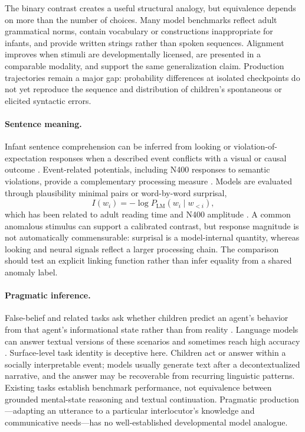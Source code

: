 The binary contrast creates a useful structural analogy, but equivalence depends on more than the number of choices. Many model benchmarks reflect adult grammatical norms, contain vocabulary or constructions inappropriate for infants, and provide written strings rather than spoken sequences. Alignment improves when stimuli are developmentally licensed, are presented in a comparable modality, and support the same generalization claim. Production trajectories remain a major gap: probability differences at isolated checkpoints do not yet reproduce the sequence and distribution of children's spontaneous or elicited syntactic errors.

\paragraph{Sentence meaning.}
Infant sentence comprehension can be inferred from looking or violation-of-expectation responses when a described event conflicts with a visual or causal outcome \citep{aslin2007s,Margoni2023}. Event-related potentials, including N400 responses to semantic violations, provide a complementary processing measure \citep{friedrich2006early,lozano2025development}. Models are evaluated through plausibility minimal pairs or word-by-word surprisal,
\[
  I(w_i) = -\log P_{\mathrm{LM}}(w_i \mid w_{<i}),
\]
which has been related to adult reading time and N400 amplitude \citep{hale2001probabilistic,SmithLevy2013,frank2015erp,michaelov2024strong}. A common anomalous stimulus can support a calibrated contrast, but response magnitude is not automatically commensurable: surprisal is a model-internal quantity, whereas looking and neural signals reflect a larger processing chain. The comparison should test an explicit linking function rather than infer equality from a shared anomaly label.

\paragraph{Pragmatic inference.}
False-belief and related tasks ask whether children predict an agent's behavior from that agent's informational state rather than from reality \citep{WimmerPerner1983,Wellman2001,Astington2007}. Language models can answer textual versions of these scenarios and sometimes reach high accuracy \citep{Kosinski2023,Kosinski2023b,Strachan2024}. Surface-level task identity is deceptive here. Children act or answer within a socially interpretable event; models usually generate text after a decontextualized narrative, and the answer may be recoverable from recurring linguistic patterns. Existing tasks establish benchmark performance, not equivalence between grounded mental-state reasoning and textual continuation. Pragmatic production---adapting an utterance to a particular interlocutor's knowledge and communicative needs---has no well-established developmental model analogue.

